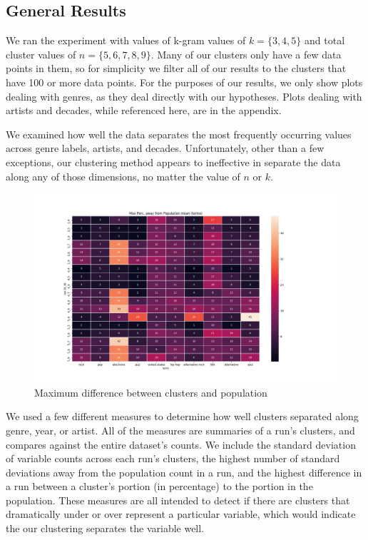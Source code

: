 \subsection{General Results}

We ran the experiment with values of k-gram values of $k=\{3,4,5\}$ and 
total cluster values of $n=\{5,6,7,8,9\}$.
Many of our clusters only have a few data points in them,
so for simplicity we filter all of our results to the clusters that have
100 or more data points.
For the purposes of our results, we only show plots dealing with genres,
as they deal directly with our hypotheses.
Plots dealing with artists and decades, while referenced here,
are in the appendix.

We examined how well the data separates the most frequently occurring values
across genre labels, artists, and decades.
Unfortunately, other than a few exceptions, our clustering method appears to ineffective 
in separate the data along any of those dimensions, no matter the value of $n$ or $k$.

\begin{figure}[ht]
    \centering
    \includegraphics[width=1.2\textwidth]{perc_away_terms}
    \caption{Maximum difference between clusters and population}
    \label{fig:all}
\end{figure}

We used a few different measures to determine how well clusters separated along genre, year, or artist.
All of the measures are summaries of a run's clusters, and compares against the entire dataset's counts.
We include the standard deviation of variable counts across each run's clusters,
the highest number of standard deviations away from the population count in a run,
and the highest difference in a run between a cluster's portion (in percentage) to the portion in the population.
These measures are all intended to detect if there are clusters that dramatically under or over represent a particular variable,
which would indicate the our clustering separates the variable well.

